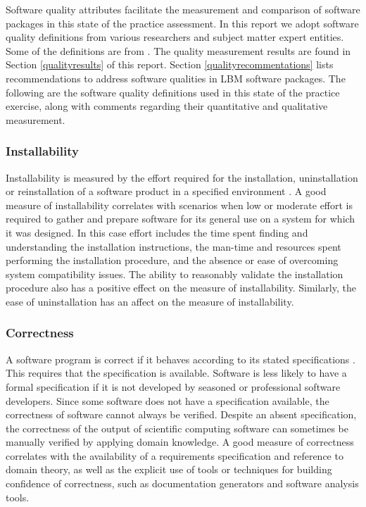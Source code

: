 \documentclass[12pt, notitlepage]{article}
\begin{document}
Software quality attributes facilitate the measurement and comparison of software packages in this state of the practice assessment. In this report we adopt software quality definitions from various researchers and subject matter expert entities. Some of the definitions are from \cite{Smithetal2020}. The quality measurement results are found in Section \ref{qualityresults} of this report. Section \ref{qualityrecommentations} lists recommendations to address software qualities in LBM software packages. The following are the software quality definitions used in this state of the practice exercise, along with comments regarding their quantitative and qualitative measurement.

\subsubsection{Installability} 

Installability is measured by the effort required for the installation, uninstallation or reinstallation of a software product in a specified
environment \citep{ISO/IEC25010} \citep{lenhard2013measuring}. A good measure of installability correlates with scenarios when low or moderate effort is required to gather and prepare software for its general use on a system for which it was designed. In this case effort includes the time spent finding and understanding the installation instructions, the man-time and resources spent performing the installation procedure, and the absence or ease of overcoming system compatibility issues. The ability to reasonably validate the installation procedure also has a positive effect on the measure of installability. Similarly, the ease of uninstallation has an affect on the measure of installability. 

\subsubsection{Correctness}

 A software program is correct if it behaves according to its stated
specifications \citep{GhezziEtAl2003}. This requires that the specification is available. Software is less likely to have a formal specification if it is not developed by seasoned or professional software developers. Since some software does not have a specification available, the correctness of software cannot always be verified. Despite an absent specification, the correctness of the output of scientific computing software can sometimes be manually verified by applying domain knowledge. A good measure of correctness correlates with the availability of a requirements specification and reference to domain theory, as well as the explicit use of tools or techniques for building confidence of correctness, such as documentation generators and software analysis tools.
\end{document}
